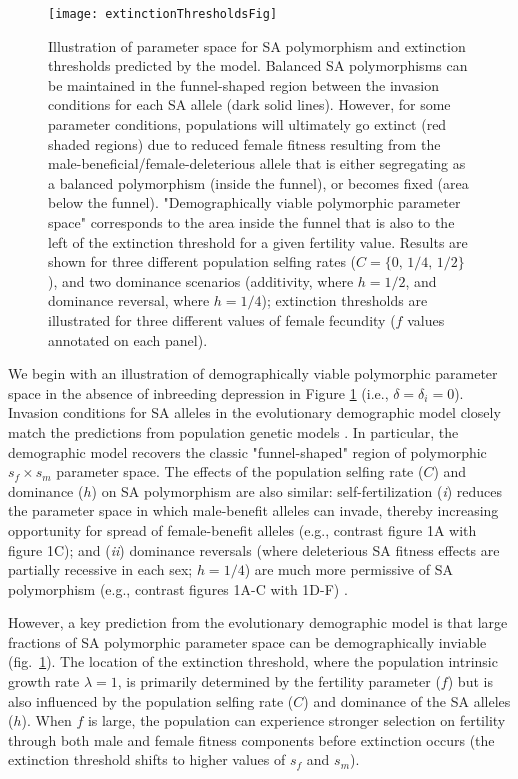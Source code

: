 \documentclass[11pt,draft]{article}
\begin{document}
 \begin{figure}[htbp]
 \centering
 \texttt{[image: extinctionThresholdsFig]}
 \caption{\footnotesize{Illustration of parameter space for SA polymorphism and extinction thresholds predicted by the model. Balanced SA polymorphisms can be maintained in the funnel-shaped region between the invasion conditions for each SA allele (dark solid lines). However, for some parameter conditions, populations will ultimately go extinct (red shaded regions) due to reduced female fitness resulting from the male-beneficial/female-deleterious allele that is either segregating as a balanced polymorphism (inside the funnel), or becomes fixed (area below the funnel). "Demographically viable polymorphic parameter space" corresponds to the area inside the funnel that is also to the left of the extinction threshold for a given fertility value. Results are shown for three different population selfing rates ($C = \{0,\,1/4,\,1/2\}$), and two dominance scenarios (additivity, where $h = 1/2$, and dominance reversal, where $h = 1/4$); extinction thresholds are illustrated for three different values of female fecundity ($f$ values annotated on each panel).}}
 \label{fig:extThresholds}
 \end{figure}

We begin with an illustration of demographically viable polymorphic parameter space in the absence of inbreeding depression in Figure \ref{fig:extThresholds} (i.e., $\delta = \delta_i = 0$). Invasion conditions for SA alleles in the evolutionary demographic model closely match the predictions from population genetic models \citep{Kidwell1977, JordanConnallon2014, Olito2017}. In particular, the demographic model recovers the classic "funnel-shaped" region of polymorphic $s_f \times s_m$ parameter space. The effects of the population selfing rate ($C$) and dominance ($h$) on SA polymorphism are also similar: self-fertilization ({\itshape i}) reduces the parameter space in which male-benefit alleles can invade, thereby increasing opportunity for spread of female-benefit alleles (e.g., contrast figure 1A with figure 1C); and ({\itshape ii}) dominance reversals (where deleterious SA fitness effects are partially recessive in each sex; $h = 1/4$) are much more permissive of SA polymorphism (e.g., contrast figures 1A-C with 1D-F) \citep{JordanConnallon2014, Olito2017}. 

However, a key prediction from the evolutionary demographic model is that large fractions of SA polymorphic parameter space can be demographically inviable (fig.~\ref{fig:extThresholds}). The location of the extinction threshold, where the population intrinsic growth rate $\lambda = 1$, is primarily determined by the fertility parameter ($f$) but is also influenced by the population selfing rate ($C$) and dominance of the SA alleles ($h$). When $f$ is large, the population can experience stronger selection on fertility through both male and female fitness components before extinction occurs (the extinction threshold shifts to higher values of $s_f$ and $s_m$). 
\end{document}
